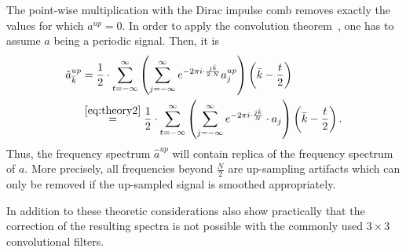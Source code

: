 \documentclass[letterpaper]{article} %
\begin{document}
The point-wise multiplication with the Dirac impulse comb removes exactly the values for which $a^{up}=0$. In order to apply the convolution theorem~\cite{conv-theorem}, one has to assume $a$ being a periodic signal. Then, it is 
\begin{align}\hat{a}^{up}_{\bar{k}} &
=\frac{1}{2}\cdot  \sum_{t=-\infty}^{\infty} \left(\sum_{j=-\infty}^{\infty}%
e^{-2\pi i\cdot\frac{j\bar{k}}{2\cdot N}}a^{up}_j\right)\left(\bar{k}-\frac{t}{2}\right)\, \nonumber\\
&\overset{\eqref{eq:theory2}}{=}\frac{1}{2}\cdot  \sum_{t=-\infty}^{\infty} \left(\sum_{j=-\infty}^{\infty}%
e^{-2\pi i\cdot\frac{j\bar{k}}{N}}\cdot a_j\right)\left(\bar{k}-\frac{t}{2}\right).
\end{align}
Thus, the frequency spectrum $\hat{a}^{up}$ will contain replica of the frequency spectrum of $a$. More precisely, all frequencies beyond $\frac{N}{2}$ are up-sampling artifacts which can only be removed if the up-sampled signal is smoothed appropriately. 


In addition to these theoretic considerations \cite{margret2020upconvolution} also show practically that the correction of the resulting spectra is not possible with the commonly used $3\times 3$ convolutional filters.





\end{document}
